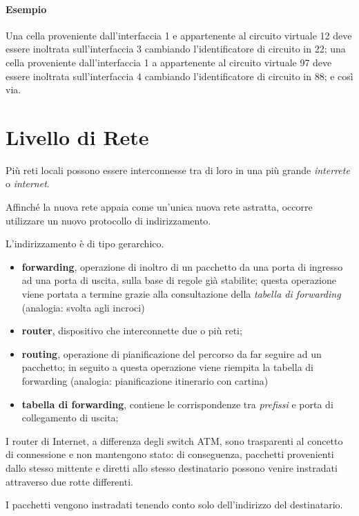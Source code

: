 \documentclass[12pt,a4paper]{article}
\begin{document}
\paragraph{Esempio}
Una cella proveniente dall'interfaccia 1 e appartenente al circuito
virtuale 12 deve essere inoltrata sull'interfaccia 3 cambiando
l'identificatore di circuito in 22; una cella proveniente
dall'interfaccia 1 a appartenente al circuito virtuale 97 deve essere
inoltrata sull'interfaccia 4 cambiando l'identificatore di circuito in
88; e così via.

\section{Livello di Rete}
Più reti locali possono essere interconnesse tra di loro in una più
grande \emph{interrete} o \emph{internet}.

Affinché la nuova rete appaia come un'unica nuova rete astratta,
occorre utilizzare un nuovo protocollo di indirizzamento.

L'indirizzamento è di tipo gerarchico.

\begin{itemize}
  \item \textbf{forwarding}, operazione di inoltro di un pacchetto da
    una porta di ingresso ad una porta di uscita, sulla base di regole
    già stabilite; questa operazione viene portata a termine grazie
    alla consultazione della \emph{tabella di forwarding} (analogia:
    svolta agli incroci)
  \item \textbf{router}, dispositivo che interconnette due o più reti;
  \item \textbf{routing}, operazione di pianificazione del percorso da
    far seguire ad un pacchetto; in seguito a questa operazione viene
    riempita la tabella di forwarding (analogia: pianificazione
    itinerario con cartina)
  \item \textbf{tabella di forwarding}, contiene le corrispondenze tra
    \emph{prefissi} e porta di collegamento di uscita;
\end{itemize}

I router di Internet, a differenza degli switch ATM, sono trasparenti al
concetto di connessione e non mantengono stato: di conseguenza,
pacchetti provenienti dallo stesso mittente e diretti allo stesso
destinatario possono venire instradati attraverso due rotte differenti.

I pacchetti vengono instradati tenendo conto solo dell'indirizzo del
destinatario.
\end{document}
